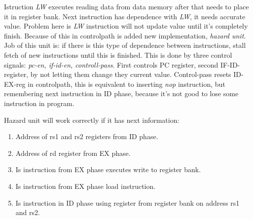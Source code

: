 \documentclass{scrreprt}
\begin{document}
    Istruction \textit{LW} executes reading data from data memory after that needs to place it in register bank. Next instruction has dependence with \textit{LW}, it needs accurate value. Problem here is \textit{LW} instruction will not update value until it's completely finish. Because of this in controlpath is added new implementation, \textit{hazard unit}. Job of this unit is: if there is this type of dependence between instructions, stall fetch of new instructions until this is finished. This is done by three control signals: \textit{pc-en, if-id-en, controll-pass}. First controls PC register, second IF-ID-register, by not letting them change they current value. Control-pass resets ID-EX-reg in controlpath, this is equivalent to inserting \textit{nop} instruction, but remembering next instruction in ID phase, because it's not good to lose some instruction in program. 
    \hfill \break
    
    Hazard unit will work correctly if it has next information:
    \begin{enumerate}
        \item Address of rs1 and rs2 registers from ID phase.
        \item Address of rd register from EX phase.
        \item Is instruction from EX phase executes write to register bank.
        \item Is instruction from EX phase load instruction.
        \item Is instruction in ID phase using register from register bank on address rs1 and rs2.
    \end{enumerate}
\end{document}
